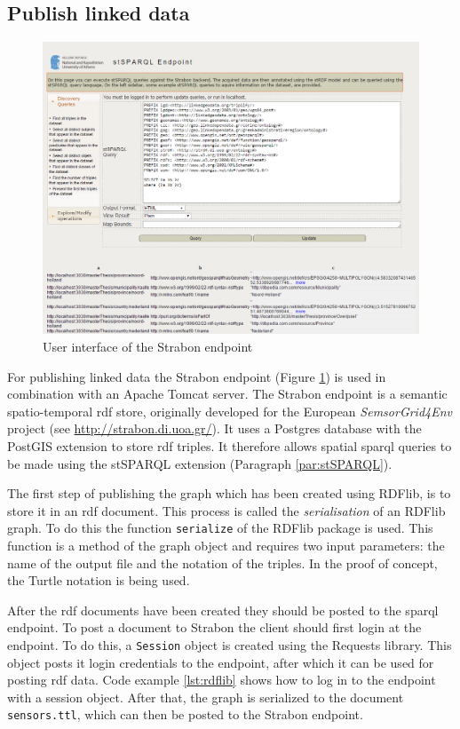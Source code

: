 \subsection{Publish linked data}

\begin{figure}
	\centering
	\includegraphics[width=\linewidth]{figs/Strabon.PNG}
	\caption{User interface of the Strabon endpoint}
	\label{fig:Strabon}
\end{figure}

For publishing linked data the Strabon endpoint (Figure \ref{fig:Strabon}) is used in combination with an Apache Tomcat server. The Strabon endpoint is a semantic spatio-temporal \ac{rdf} store, originally developed for the European  \textit{SemsorGrid4Env} project (see \url{http://strabon.di.uoa.gr/}). It uses a Postgres database with the PostGIS extension to store \ac{rdf} triples. It therefore allows spatial \ac{sparql} queries to be made using the stSPARQL extension (Paragraph \ref{par:stSPARQL}).  

The first step of publishing the graph which has been created using RDFlib, is to store it in an \ac{rdf} document. This process is called the \textit{serialisation} of an RDFlib graph. To do this the function \texttt{serialize} of the RDFlib package is used. This function is a method of the graph object and requires two input parameters: the name of the output file and the notation of the triples. In the proof of concept, the Turtle notation is being used. 

After the \ac{rdf} documents have been created they should be posted to the \ac{sparql} endpoint. To post a document to Strabon the client should first login at the endpoint. To do this, a \texttt{Session} object is created using the Requests library. This object posts it login credentials to the endpoint, after which it can be used for posting \ac{rdf} data. Code example \ref{lst:rdflib} shows how to log in to the endpoint with a session object. After that, the graph is serialized to the document \texttt{sensors.ttl}, which can then be posted to the Strabon endpoint.   

